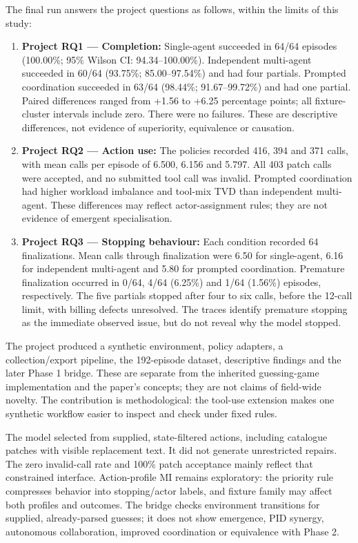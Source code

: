 \documentclass[12pt,a4paper,oneside]{report}
\begin{document}
The final run answers the project questions as follows, within the limits of this study:

\begin{enumerate}
\item \textbf{Project RQ1 --- Completion:} Single-agent succeeded in 64/64 episodes (100.00\%; 95\% Wilson CI: 94.34--100.00\%). Independent multi-agent succeeded in 60/64 (93.75\%; 85.00--97.54\%) and had four partials. Prompted coordination succeeded in 63/64 (98.44\%; 91.67--99.72\%) and had one partial. Paired differences ranged from +1.56 to +6.25 percentage points; all fixture-cluster intervals include zero. There were no failures. These are descriptive differences, not evidence of superiority, equivalence or causation.
\item \textbf{Project RQ2 --- Action use:} The policies recorded 416, 394 and 371 calls, with mean calls per episode of 6.500, 6.156 and 5.797. All 403 patch calls were accepted, and no submitted tool call was invalid. Prompted coordination had higher workload imbalance and tool-mix TVD than independent multi-agent. These differences may reflect actor-assignment rules; they are not evidence of emergent specialisation.
\item \textbf{Project RQ3 --- Stopping behaviour:} Each condition recorded 64 finalizations. Mean calls through finalization were 6.50 for single-agent, 6.16 for independent multi-agent and 5.80 for prompted coordination. Premature finalization occurred in 0/64, 4/64 (6.25\%) and 1/64 (1.56\%) episodes, respectively. The five partials stopped after four to six calls, before the 12-call limit, with billing defects unresolved. The traces identify premature stopping as the immediate observed issue, but do not reveal why the model stopped.
\end{enumerate}
The project produced a synthetic environment, policy adapters, a collection/export pipeline, the 192-episode dataset, descriptive findings and the later Phase 1 bridge. These are separate from the inherited guessing-game implementation and the paper’s concepts; they are not claims of field-wide novelty. The contribution is methodological: the tool-use extension makes one synthetic workflow easier to inspect and check under fixed rules.

The model selected from supplied, state-filtered actions, including catalogue patches with visible replacement text. It did not generate unrestricted repairs. The zero invalid-call rate and 100\% patch acceptance mainly reflect that constrained interface. Action-profile MI remains exploratory: the priority rule compresses behavior into stopping/actor labels, and fixture family may affect both profiles and outcomes. The bridge checks environment transitions for supplied, already-parsed guesses; it does not show emergence, PID synergy, autonomous collaboration, improved coordination or equivalence with Phase 2.
\end{document}
